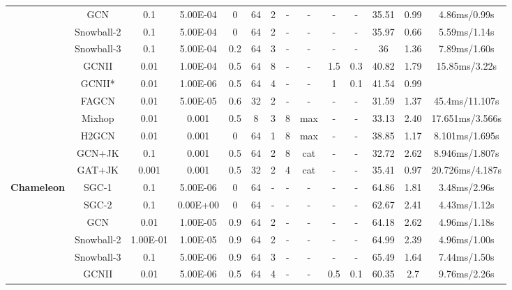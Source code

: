 \documentclass{article}
\newcommand{\0}{{\boldsymbol{0}}}
\newcommand{\6}{{\partial}}
\newcommand{\8}{{\infty}}
\newcommand{\4}{{\nabla}}
\begin{document}
\begin{table}[htbp]
{\begin{tabular}{c|c|cccccccccccc}
          & GCN   & 0.1   & 5.00E-04 & 0     & 64    & 2     & -     & -     & -     & -     & 35.51 & 0.99  & 4.86ms/0.99s \\
          & Snowball-2 & 0.1   & 5.00E-04 & 0     & 64    & 2     & -     & -     & -     & -     & 35.97 & 0.66  & 5.59ms/1.14s \\
          & Snowball-3 & 0.1   & 5.00E-04 & 0.2   & 64    & 3     & -     & -     & -     & -     & 36    & 1.36  & 7.89ms/1.60s \\
          & GCNII & 0.01  & 1.00E-04 & 0.5   & 64    & 8     & -     & -     & 1.5   & 0.3   & 40.82 & 1.79  & 15.85ms/3.22s \\
          & GCNII* & 0.01  & 1.00E-06 & 0.5   & 64    & 4     & -     & -     & 1     & 0.1   & 41.54 & 0.99  &  \\
          & FAGCN & 0.01  & 5.00E-05 & 0.6   & 32    & 2     & -     & -     & -     & -     & 31.59 & 1.37  & 45.4ms/11.107s \\
          &  Mixhop & 0.01  & 0.001 & 0.5   & 8     & 3     & 8     & {max} & - & - & 33.13 & 2.40  & {17.651ms/3.566s} \\
          & H2GCN & 0.01  & 0.001 & 0     & 64    & 1     & 8     & {max} & - & - & 38.85 & 1.17  & {8.101ms/1.695s} \\
          & GCN+JK & 0.1   & 0.001 & 0.5   & 64    & 2     & 8     & {cat} & - & - & 32.72 & 2.62  & {8.946ms/1.807s} \\
          &  GAT+JK & 0.001 & 0.001 & 0.5   & 32    & 2     & 4     & {cat} & - & - & 35.41 & 0.97  & {20.726ms/4.187s} \\
          \midrule
    \multirow{12}[0]{*}{\textbf{Chameleon}} & SGC-1 & 0.1   & 5.00E-06 & 0     & 64    & -     & -     & -     & -     & -     & 64.86 & 1.81  & 3.48ms/2.96s \\
          & SGC-2 & 0.1   & 0.00E+00 & 0     & 64    & -     & -     & -     & -     & -     & 62.67 & 2.41  &  4.43ms/1.12s \\
          & GCN   & 0.01  & 1.00E-05 & 0.9   & 64    & 2     & -     & -     & -     & -     & 64.18 & 2.62  & 4.96ms/1.18s \\
          & Snowball-2 & 1.00E-01 & 1.00E-05 & 0.9   & 64    & 2     & -     & -     & -     & -     & 64.99 & 2.39  & 4.96ms/1.00s \\
          & Snowball-3 & 0.1   & 5.00E-06 & 0.9   & 64    & 3     & -     & -     & -     & -     & 65.49 & 1.64  & 7.44ms/1.50s \\
          & GCNII & 0.01  & 5.00E-06 & 0.5   & 64    & 4     & -     & -     & 0.5   & 0.1   & 60.35 & 2.7   & 9.76ms/2.26s \\

\end{tabular}}
\end{table}
\end{document}
